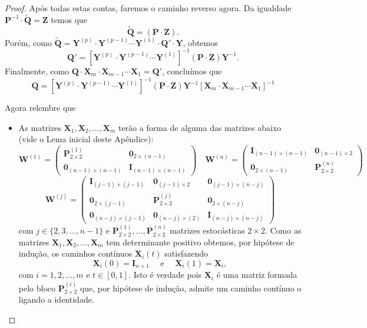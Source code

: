 \documentclass[twoside,openright,titlepage,numbers=noenddot,headinclude,  lineheaders footinclude=true,cleardoublepage=empty,
                                BCOR=5mm,paper=a4,fontsize=12pt ]{scrbook}
\theoremstyle{definition}
\begin{document}
\begin{proof}
Após todas estas contas, faremos o caminho reverso agora.
Da igualdade $ 
\mathbf{P}^{-1} \cdot \mathbf{\widetilde{Q}} = \mathbf{Z}$
temos que
\[
\mathbf{\widetilde{Q}} = 
(\mathbf{P} \cdot \mathbf{Z}).
\]
Porém, como
$
\mathbf{\widetilde{Q}} = 
\mathbf{Y}^{(p)} \cdot \mathbf{Y}^{(p-1)}
\cdots \mathbf{Y}^{(1)} \cdot \mathbf{Q'} \cdot \mathbf{Y}
$, obtemos
\[
\mathbf{Q'} =
[\mathbf{Y}^{(p)} \cdot \mathbf{Y}^{(p-1)}
\cdots \mathbf{Y}^{(1)} ]^{-1} 
(\mathbf{P} \cdot \mathbf{Z}) \mathbf{Y}^{-1}.
\]
Finalmente, como 
$\mathbf{Q} \cdot \mathbf{X}_m \cdot \mathbf{X}_{m-1}  \cdots
 \mathbf{X}_1 =  \mathbf{Q'}$, concluímos que
\[
\mathbf{Q} =
[\mathbf{Y}^{(p)} \cdot \mathbf{Y}^{(p-1)}
\cdots \mathbf{Y}^{(1)} ]^{-1} 
(\mathbf{P} \cdot \mathbf{Z}) \mathbf{Y}^{-1}
[\mathbf{X}_m \cdot \mathbf{X}_{m-1}  \cdots
 \mathbf{X}_1]^{-1}
\]

Agora relembre que
\begin{itemize}
\item As matrizes 
 $\mathbf{X}_1, \mathbf{X}_2, \ldots,  \mathbf{X}_m$ terão a forma de alguma das matrizes
abaixo (vide o Lema inicial deste Apêndice):
\[
\mathbf{W}^{(1)} = 
\begin{pmatrix}
\mathbf{P}^{(1)}_{2 \times 2} & \mathbf{0}_{2 \times (n-1)}\\
\mathbf{0}_{(n-1) \times (n-1)} & \mathbf{I}_{(n-1)\times (n-1)}
\end{pmatrix}
\quad
\mathbf{W}^{(n)} = 
\begin{pmatrix}
\mathbf{I}_{(n-1)\times (n-1)}& \mathbf{0}_{(n-1) \times 2} \\
\mathbf{0}_{2 \times (n-1)}   & \mathbf{P}^{(n)}_{2 \times 2}   
\end{pmatrix}
\]
\[
\mathbf{W}^{(j)} = 
\begin{pmatrix}
\mathbf{I}_{(j-1)\times (j-1)}& \mathbf{0}_{(j-1) \times 2} &
\mathbf{0}_{(j-1) \times (n-j)} \\
\mathbf{0}_{2 \times (j-1)} & \mathbf{P}^{(j)}_{2 \times 2} &
 \mathbf{0}_{2 \times (n-j)}\\
\mathbf{0}_{(n-j) \times (j-1)} & \mathbf{0}_{(n-j) \times (2)}
 & \mathbf{I}_{(n-j)\times (n-j)}
\end{pmatrix}
\]
com $ j \in \{2, 3, \ldots, n-1\}$ e
$\mathbf{P}^{(1)}_{2 \times 2}, \ldots, 
\mathbf{P}^{(n)}_{2 \times 2}$ matrizes estocásticas $ 2 \times 2$.
Como as matrizes 
$\mathbf{X}_1, \mathbf{X}_2, \ldots,  \mathbf{X}_m$ tem
determinante positivo obtemos, por hipótese de indução,
os caminhos contínuos $\bm{X}_i(t)$ satisfazendo
\[
\mathbf{X}_i(0) = \mathbf{I}_{n+1} \quad \text{ e } \quad
\mathbf{X}_i(1) = \mathbf{X}_i,
\]
com $i = 1, 2, \ldots, m$ e $ t \in [0,1]$.
Isto é verdade pois $\mathbf{X}_i$ é uma matriz formada pelo bloco 
$\mathbf{P}^{(i)}_{2 \times 2}$ que, por hipótese de 
indução, admite um caminho contínuo o ligando a identidade.


\end{itemize}
\end{proof}
\end{document}
